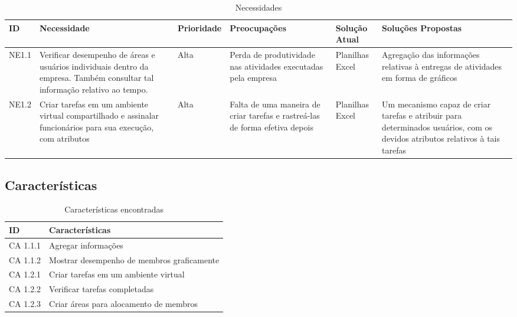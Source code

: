 \begin{apendicesenv}
\begin{table}[!h]
\centering
\caption{Necessidades}
\label{needs}
\begin{tabular}{|p{1cm}|p{3cm}|p{2cm}|p{3cm}|p{2cm}|p{3cm}|}
\hline
ID    & Necessidade                                                                                                                & Prioridade & Preocupações                                                                & Solução Atual   & Soluções Propostas                                                                                                           \\ \hline
NE1.1 & Verificar desempenho de áreas e usuários individuais dentro da empresa. Também consultar tal informação relativo ao tempo. & Alta       & Perda de produtividade nas atividades executadas pela empresa               & Planilhas Excel & Agregação das informações relativas à entregas de atividades em forma de gráficos                                            \\ \hline
NE1.2 & Criar tarefas em um ambiente virtual compartilhado e assinalar funcionários para sua execução, com atributos               & Alta       & Falta de uma maneira de criar tarefas e rastreá-las de forma efetiva depois & Planilhas Excel & Um mecanismo capaz de criar tarefas e atribuir para determinados usuários, com os devidos atributos relativos à tais tarefas \\ \hline
\end{tabular}
\end{table}

\pagebreak
\clearpage
\newpage

\subsection{Características}

\begin{table}[!h]
\centering
\caption{Características encontradas}
\label{looks}
\begin{tabular}{|p{4cm}|p{4cm}|}
\hline
ID       & Características                            \\ \hline
CA 1.1.1 & Agregar informações                        \\ \hline
CA 1.1.2 & Mostrar desempenho de membros graficamente \\ \hline
CA 1.2.1 & Criar tarefas em um ambiente virtual       \\ \hline
CA 1.2.2 & Verificar tarefas completadas              \\ \hline
CA 1.2.3 & Criar áreas para alocamento de membros     \\ \hline
\end{tabular}
\end{table}


\end{apendicesenv}
